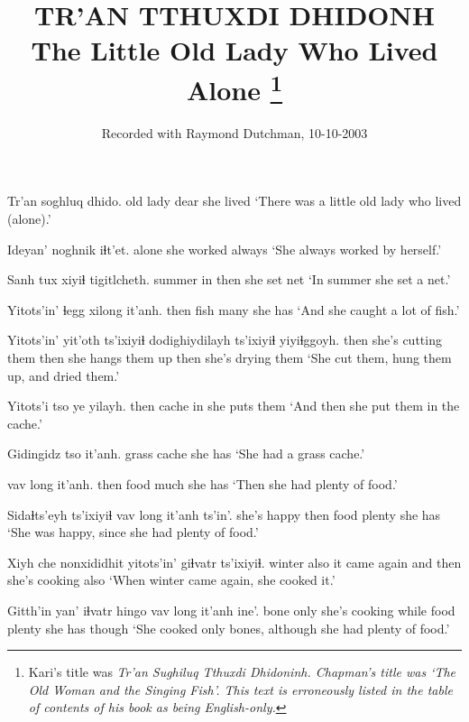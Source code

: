 \documentclass[12pt]{article}
\begin{document}
\title{TR'AN TTHUXDI DHIDONH \newline The Little Old Lady Who Lived Alone \footnote{Kari's title was \em Tr'an Sughiluq Tthuxdi Dhidoninh. \em Chapman's title was `The Old Woman and the Singing Fish'. This text is erroneously listed in the table of contents of his book as being English-only.}} 

\author{Recorded with Raymond Dutchman, 10-10-2003} 

\date{}

\maketitle

\gll Tr'an soghluq dhido.
{old lady} dear {she lived}
\glt `There was a little old lady who lived (alone).'
\glend

\gll Ideyan' noghnik iɬt'et.
alone {she worked} always
\glt `She always worked by herself.'
\glend

\gll Sanh tux xiyiɬ tigitlcheth.
summer in then {she set net}
\glt `In summer she set a net.'
\glend

\gll Yitots'in' ɬegg xilong it'anh.
then fish many {she has}
\glt `And she caught a lot of fish.'
\glend

\gll Yitots'in' yit'oth ts'ixiyiɬ dodighiydilayh ts'ixiyiɬ yiyiɬggoyh.
then {she's cutting them} then {she hangs them up} then {she's drying them}
\glt `She cut them, hung them up, and dried them.'
\glend

\gll Yitots'i tso ye yilayh.
then cache in {she puts them}
\glt `And then she put them in the cache.'
\glend

\gll Gidingidz tso it'anh.
grass cache {she has}
\glt `She had a grass cache.'
\glend

 vav long it'anh.
then food much {she has}
\glt `Then she had plenty of food.'
\glend

\gll Sidaɬts'eyh ts'ixiyiɬ vav long it'anh ts'in'.
{she's happy} then food plenty {she has} 
\glt `She was happy, since she had plenty of food.'
\glend

\gll Xiyh che nonxididhit yitots'in' giɬvatr ts'ixiyiɬ.
winter also {it came again} {and then} {she's cooking} also
\glt `When winter came again, she cooked it.'
\glend

\gll Gitth'in yan' iɬvatr hingo vav long it'anh ine'.
bone only {she's cooking} while food plenty {she has} though
\glt `She cooked only bones, although she had plenty of food.'
\glend
\end{document}

